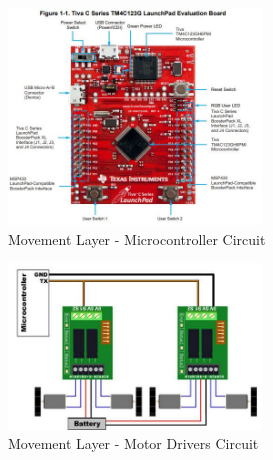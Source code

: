 
\begin{figure}[h!]
	\centering
 	\includegraphics[width=0.60\textwidth]{images/circuits/1_redboard.jpg}
 \caption{Movement Layer - Microcontroller Circuit}
 \label{fig:Movement Layer - Microcontroller Circuit}
\end{figure}

\begin{figure}[h!]
	\centering
 	\includegraphics[width=0.60\textwidth]{images/circuits/2_sabertooth.JPG}
 \caption{Movement Layer - Motor Drivers Circuit}
 \label{fig:Movement Layer - Motor Drivers Circuit}
\end{figure}